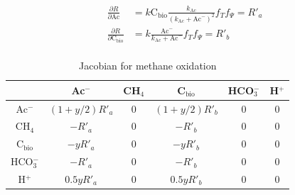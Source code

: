 \documentclass[12pt, a4paper]{article}
\begin{document}
\begin{align*}
\frac{\partial R}{\partial \text{Ac}} &= k \text{C}_\text{bio} \frac{k_\text{Ac}}{(k_\text{Ac} + \text{Ac}^-)^2}  f_T f_\Psi = R'_a \\
\frac{\partial R}{\partial \text{C}_\text{bio}} &= k \frac{\text{Ac}^-}{k_\text{Ac} + \text{Ac}^-}  f_T f_\Psi = R'_b\\
\end{align*}

\begin{table}[hb]
\centering
 \caption{Jacobian for methane oxidation} 
\begin{tabular}{ c | ccccc }
                      &  Ac$^-$ & CH$_4$  & C$_\text{bio}$ &  HCO$_3^-$  & H$^+$\\
  \hline 
  Ac$^-$              &$(1+y/2)R'_a$  & 0 & $(1+y/2)R'_b$   & 0 &0\\
  CH$_4$           &$-R'_a$          & 0 & $-R'_b$  &0 &0\\
  C$_\text{bio}$ &$-yR'_a$       &  0 &$-yR'_b$ &0 &0\\
  HCO$_3^-$     &$-R'_a$         &  0 &$-R'_b$     &0 &0\\
  H$^+$               &$0.5yR'_a$  &  0 &$0.5yR'_b$     &0 &0
\end{tabular}
\end{table}



\clearpage


\end{document}
